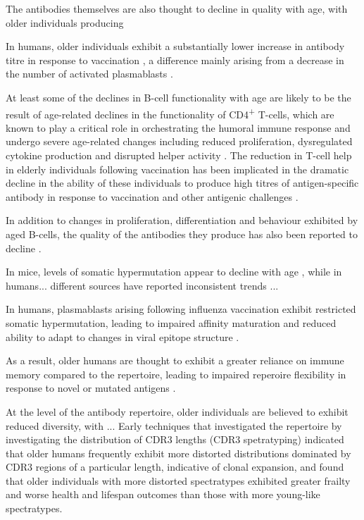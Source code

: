 The antibodies themselves are also thought to decline in quality with age, with older individuals producing 

In humans, older individuals exhibit a substantially lower increase in antibody titre in response to vaccination \parencite{sasaki2011limited,aberle2013mechanistic}, a difference mainly arising from a decrease in the number of activated plasmablasts \parencite{sasaki2011limited,montecino2013immunosenescence}.

At least some of the declines in B-cell functionality with age are likely to be the result of age-related declines in the functionality of CD4\textsuperscript{+} T-cells, which are known to play a critical role in orchestrating the humoral immune response \parencite{montecino2013immunosenescence} and undergo severe age-related changes including reduced proliferation, dysregulated cytokine production and disrupted helper activity \parencite{aberle2013mechanistic}. The reduction in T-cell help in elderly individuals following vaccination 
has been implicated in the dramatic decline in the ability of these individuals to produce high titres of antigen-specific antibody in response to vaccination and other antigenic challenges \parencite{aberle2013mechanistic}.

In addition to changes in proliferation, differentiation and behaviour exhibited by aged B-cells, the quality of the antibodies they produce has also been reported to decline \parencite{montecino2013immunosenescence}. 

In mice, levels of somatic hypermutation appear to decline with age \parencite{henry2019influenza}, %
while in humans... %
different sources have reported inconsistent trends \parencite{blomberg2013age}...

In humans, plasmablasts arising following influenza vaccination exhibit restricted somatic hypermutation, leading to impaired affinity maturation and reduced ability to adapt to changes in viral epitope structure \parencite{henry2019influenza}.

As a result, older humans are thought to exhibit a greater reliance on immune memory compared to the \naive repertoire, leading to impaired reperoire flexibility in response to novel or mutated antigens \parencite{henry2019influenza}.

At the level of the antibody repertoire, older individuals are believed to exhibit reduced diversity, with ...
Early techniques that investigated the repertoire by investigating the distribution of CDR3 lengths (CDR3 spetratyping) indicated that older humans frequently exhibit more distorted distributions dominated by CDR3 regions of a particular length, indicative of clonal expansion, and found that older individuals with more distorted spectratypes exhibited greater frailty and worse health and lifespan outcomes than those with more young-like spectratypes. %

